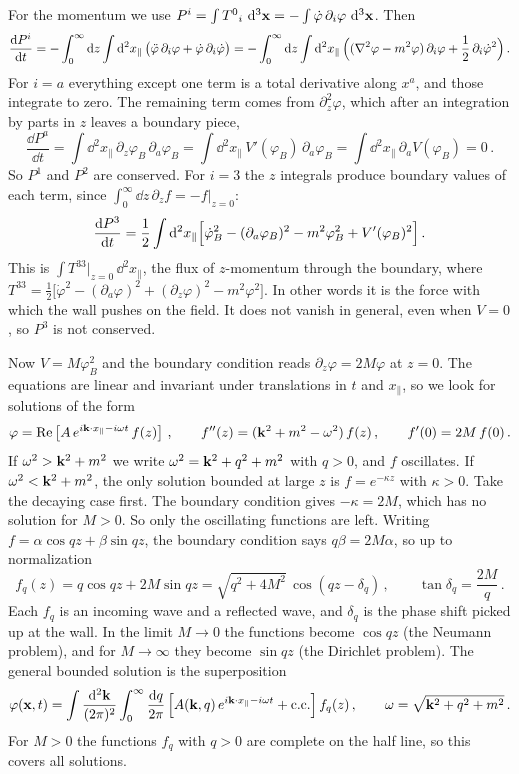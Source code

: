 For the momentum we use $P^i=\int T^0{}_i\,\mathop{}\!\mathrm{d}^3\mathbf{x}=-\int\dot\varphi\,\partial_i\varphi\,\mathop{}\!\mathrm{d}^3\mathbf{x}$.
Then
\[
\frac{\mathop{}\!\mathrm{d} P^i}{\mathop{}\!\mathrm{d} t}=-\int_0^\infty \mathop{}\!\mathrm{d} z\int \mathop{}\!\mathrm{d}^2x_\parallel\,\bigl(\ddot\varphi\,\partial_i\varphi+\dot\varphi\,\partial_i\dot\varphi\bigr)
=-\int_0^\infty \mathop{}\!\mathrm{d} z\int \mathop{}\!\mathrm{d}^2x_\parallel\,\Bigl((\nabla^2\varphi-m^2\varphi)\,\partial_i\varphi+\frac12\,\partial_i\dot\varphi^2\Bigr)\,.
\]
For $i=a$ everything except one term is a total derivative along $x^a$, and
those integrate to zero. The remaining term comes from $\partial_z^2\varphi$,
which after an integration by parts in $z$ leaves a boundary piece,
\[
\frac{\dd P^a}{\dd t}=\int \dd^2x_\parallel\,\partial_z\varphi_B\,\partial_a\varphi_B
=\int \dd^2x_\parallel\,V'(\varphi_B)\,\partial_a\varphi_B
=\int \dd^2x_\parallel\,\partial_a V(\varphi_B)=0\,.
\]
So $P^1$ and $P^2$ are conserved. For $i=3$ the $z$ integrals produce boundary
values of each term, since $\int_0^\infty \dd z\,\partial_z f=-f\big|_{z=0}$:
\[
\frac{\mathop{}\!\mathrm{d} P^3}{\mathop{}\!\mathrm{d} t}=\frac12\int \mathop{}\!\mathrm{d}^2x_\parallel\Bigl[\dot\varphi_B^2-(\partial_a\varphi_B)^2-m^2\varphi_B^2+V'(\varphi_B)^2\Bigr]\,.
\]
This is $\int T^{33}\big|_{z=0}\,\dd^2x_\parallel$, the flux of $z$-momentum
through the boundary, where
$T^{33}=\frac12\bigl[\dot\varphi^2-(\partial_a\varphi)^2+(\partial_z\varphi)^2-m^2\varphi^2\bigr]$.
In other words it is the force with which the wall pushes on the field. It
does not vanish in general, even when $V=0$, so $P^3$ is not conserved.

 Now $V=M\varphi_B^2$ and the boundary condition reads
$\partial_z\varphi=2M\varphi$ at $z=0$. The equations are linear and invariant
under translations in $t$ and $x_\parallel$, so we look for solutions of the
form
\[
\varphi=\operatorname{Re}\left[A\,e^{i\mathbf{k}\cdot x_\parallel-i\omega t}\,f(z)\right]\,,\qquad
f''(z)=(\mathbf{k}^2+m^2-\omega^2)\,f(z)\,,\qquad f'(0)=2M\,f(0)\,.
\]
If $\omega^2>\mathbf{k}^2+m^2$ we write $\omega^2=\mathbf{k}^2+q^2+m^2$ with $q>0$, and $f$
oscillates. If $\omega^2<\mathbf{k}^2+m^2$, the only solution bounded at large $z$ is
$f=e^{-\kappa z}$ with $\kappa>0$. Take the decaying case first. The boundary
condition gives $-\kappa=2M$, which has no solution for $M>0$. So only the
oscillating functions are left. Writing $f=\alpha\cos qz+\beta\sin qz$, the
boundary condition says $q\beta=2M\alpha$, so up to normalization
\[
f_q(z)=q\cos qz+2M\sin qz=\sqrt{q^2+4M^2}\,\cos(qz-\delta_q)\,,\qquad\tan\delta_q=\frac{2M}q\,.
\]
Each $f_q$ is an incoming wave and a reflected wave, and $\delta_q$ is the
phase shift picked up at the wall. In the limit $M\to0$ the functions become
$\cos qz$ (the Neumann problem), and for $M\to\infty$ they become $\sin qz$
(the Dirichlet problem). The general bounded solution is the superposition
\[
\varphi(\mathbf{x},t)=\int\frac{\mathop{}\!\mathrm{d}^2\mathbf{k}}{(2\pi)^2}\int_0^\infty\frac{\mathop{}\!\mathrm{d} q}{2\pi}\,
\Bigl[A(\mathbf{k},q)\,e^{i\mathbf{k}\cdot x_\parallel-i\omega t}+\text{c.c.}\Bigr]\,f_q(z)\,,\qquad
\omega=\sqrt{\mathbf{k}^2+q^2+m^2}\,.
\]
For $M>0$ the functions $f_q$ with $q>0$ are complete on the half line, so this
covers all solutions.

